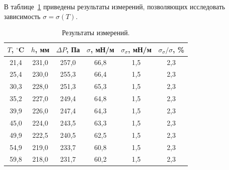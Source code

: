 \documentclass[a4paper,12pt]{article} %
\begin{document}
	В таблице~\ref{table:main} приведены результаты измерений, позволяющих исследовать зависимость $\sigma = \sigma (T)$.
\begin{table}[H]
	\caption{Результаты измерений.}
	\label{table:main}
\begin{tabular}{|c|c|c|c|c|c|}
	\hline
	$T$, $^\circ$C & $h$, мм & $\Delta P$, Па & $\sigma$, мН/м & $\sigma_\sigma$, мН/м & $\sigma_\sigma / \sigma$, \% \\ \hline
	21,4           & 231,0   & 257,0          & 66,8           & 1,5                   & 2,3                          \\ \hline
	25,4           & 230,0   & 255,3          & 66,4           & 1,5                   & 2,3                          \\ \hline
	30,3           & 228,0   & 251,3          & 65,3           & 1,5                   & 2,3                          \\ \hline
	35,2           & 227,0   & 249,4          & 64,8           & 1,5                   & 2,3                          \\ \hline
	39,9           & 226,0   & 247,4          & 64,3           & 1,5                   & 2,3                          \\ \hline
	45,0           & 224,0   & 243,5          & 63,3           & 1,5                   & 2,3                          \\ \hline
	49,9           & 222,5   & 240,5          & 62,5           & 1,5                   & 2,3                          \\ \hline
	54,9           & 219,0   & 233,7          & 60,8           & 1,5                   & 2,3                          \\ \hline
	59,8           & 218,0   & 231,7          & 60,2           & 1,5                   & 2,3                          \\ \hline
\end{tabular}
\end{table}
\end{document}
